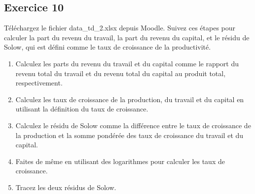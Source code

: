 \documentclass[11pt]{article}
\begin{document}
\subsection*{Exercice 10}
Téléchargez le fichier data\_td\_2.xlsx depuis Moodle.
Suivez ces étapes pour calculer la part du revenu du travail,
la part du revenu du capital, et le résidu de Solow, qui est
défini comme le taux de croissance de la productivité.

\begin{enumerate}
    \item Calculez les parts du revenu du travail et du capital comme le rapport du revenu total du travail et du revenu total du capital au produit total, respectivement.
    \item Calculez les taux de croissance de la production, du travail et du capital
    en utilisant la définition du taux de croissance.
    \item Calculez le résidu de Solow comme la différence entre le taux de croissance de la production et la somme pondérée des taux de croissance du travail et du capital.
    \item Faites de même en utilisant des logarithmes pour calculer les taux de croissance.
    \item Tracez les deux résidus de Solow.
\end{enumerate}
\end{document}
